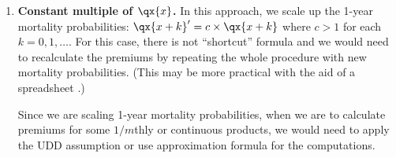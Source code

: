 \begin{enumerate}
\begin{warning}
The effects may \underline{not} be the same for other kinds of EPVs. For
example, for endowment insurance EPV:
\end{warning}

After obtaining the new values of EPVs based on the formulas here, the premiums
can be recalculated.

\item \textbf{Constant multiple of \(\qx{x}\).} In this approach, we scale up
the 1-year mortality probabilities: \(\qx{x+k}'=c\times \qx{x+k}\) where
\(c>1\) for each \(k=0,1,\dotsc\). For this case, there is not ``shortcut''
formula and we would need to recalculate the premiums by repeating the whole
procedure with new mortality probabilities. (This may be more practical with
the aid of a spreadsheet .)

\begin{note}
Since we are scaling 1-year mortality probabilities, when we are to calculate
premiums for some \(1/m\)thly or continuous products, we would need to apply
the UDD assumption or use approximation formula for the computations.
\end{note}
\end{enumerate}
